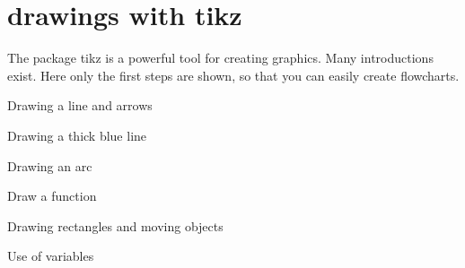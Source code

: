 %
%
%
%

\chapter{drawings with tikz}


The package tikz is a powerful tool for creating graphics. Many introductions exist. Here only the first steps are shown, so that you can easily create flowcharts.

\bigskip

Drawing a line and arrows



\medskip



\bigskip

Drawing a thick blue line



\medskip



\bigskip

Drawing an arc



\medskip



\bigskip

Draw a function



\medskip



\bigskip

Drawing rectangles and moving objects



\medskip



\bigskip


\bigskip

Use of variables



\medskip

